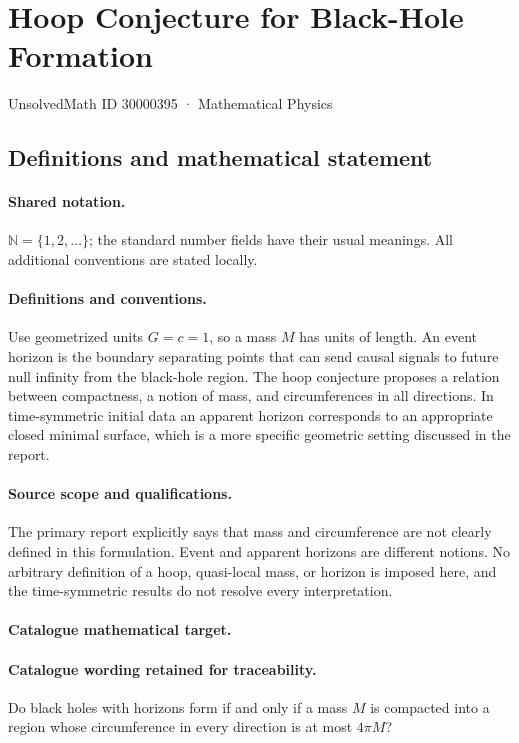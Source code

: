 \documentclass[11pt]{article}
\begin{document}
\setcounter{section}{30000394}
\section{Hoop Conjecture for Black-Hole Formation}\label{30000395}
{\small UnsolvedMath ID 30000395 · Mathematical Physics}
\subsection{Definitions and mathematical statement}

\paragraph{Shared notation.}$\mathbb N=\{1,2,\ldots\}$; the standard number fields have their usual meanings. All additional conventions are stated locally.


\paragraph{Definitions and conventions.} Use geometrized units $G=c=1$, so a mass $M$ has units of length. An event horizon is the boundary separating points that can send causal signals to future null infinity from the black-hole region. The hoop conjecture proposes a relation between compactness, a notion of mass, and circumferences in all directions. In time-symmetric initial data an apparent horizon corresponds to an appropriate closed minimal surface, which is a more specific geometric setting discussed in the report.

\paragraph{Source scope and qualifications.} The primary report explicitly says that mass and circumference are not clearly defined in this formulation. Event and apparent horizons are different notions. No arbitrary definition of a hoop, quasi-local mass, or horizon is imposed here, and the time-symmetric results do not resolve every interpretation.

\paragraph{Catalogue mathematical target.}
\paragraph{Catalogue wording retained for traceability.}
Do black holes with horizons form if and only if a mass $M$ is compacted into a region whose circumference in every direction is at most $4\pi M$?
\end{document}
